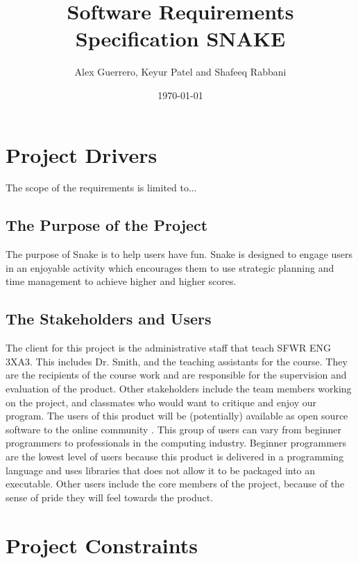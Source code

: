\documentclass[12pt]{article}
\begin{document}
\title{Software Requirements Specification
SNAKE
} 
\author{Alex Guerrero, Keyur Patel and Shafeeq Rabbani}
\date{\today}
	
\maketitle

\tableofcontents
\newpage


\section{Project Drivers}

The scope of the requirements is limited to...

\subsection{The Purpose of the Project}

		The purpose of Snake is to help users have fun. Snake is designed to engage users in an enjoyable activity which encourages them to use strategic planning and time management to achieve higher and higher scores.
		
\subsection{The Stakeholders and Users} 

The client for this project is the administrative staff that teach SFWR ENG 3XA3. This includes Dr. Smith, and the teaching assistants for the course. They are the recipients of the course work and are responsible for the supervision and evaluation of the product. Other stakeholders include the team members working on the project, and classmates who would want to critique and enjoy our program. The users of this product will be (potentially) available as open source software to the online community . This group of users can vary from beginner programmers to professionals in the computing industry. Beginner programmers are the lowest level of users because this product is delivered in a programming language and uses libraries that does not allow it to be packaged into an executable. Other users include the core members of the project, because of the sense of pride they will feel towards the product.

\section{Project Constraints}
\end{document}
